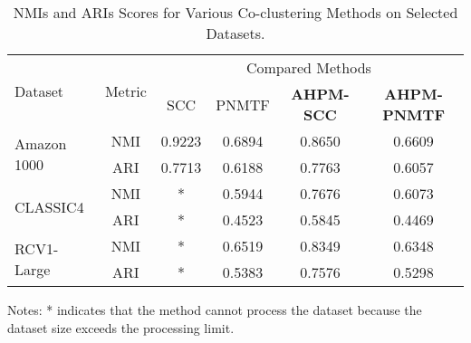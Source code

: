 \begin{table*}[!htbp]
    \centering
    \caption{NMIs and ARIs Scores for Various Co-clustering Methods on Selected Datasets.}
    \label{tab:evaluation-metrics}
    \begin{tabular}{@{} l c cccc @{}}
        \toprule
        \multirow{2}{*}{Dataset}     & \multirow{2}{*}{Metric} & \multicolumn{4}{c}{Compared Methods}                                                                                                        \\
        \cmidrule{3-6}
                                     &                         & SCC \cite{dhillon2001CoclusteringDocumentsWords} & PNMTF \cite{chen2023ParallelNonNegativeMatrix} & \textbf{AHPM-SCC} & \textbf{AHPM-PNMTF} \\
        \midrule
        \multirow{2}{*}{Amazon 1000} & NMI                     & 0.9223                                           & 0.6894                                         & 0.8650            & 0.6609              \\
                                     & ARI                     & 0.7713                                           & 0.6188                                         & 0.7763            & 0.6057              \\
        \multirow{2}{*}{CLASSIC4}    & NMI                     & *                                                & 0.5944                                         & 0.7676            & 0.6073              \\
                                     & ARI                     & *                                                & 0.4523                                         & 0.5845            & 0.4469              \\
        \multirow{2}{*}{RCV1-Large}  & NMI                     & *                                                & 0.6519                                         & 0.8349            & 0.6348              \\
                                     & ARI                     & *                                                & 0.5383                                         & 0.7576            & 0.5298              \\
        \bottomrule
    \end{tabular}
    \begin{tablenotes}
        \small
        \item Notes: * indicates that the method cannot process the dataset because the dataset size exceeds the processing limit.
    \end{tablenotes}
\end{table*}

